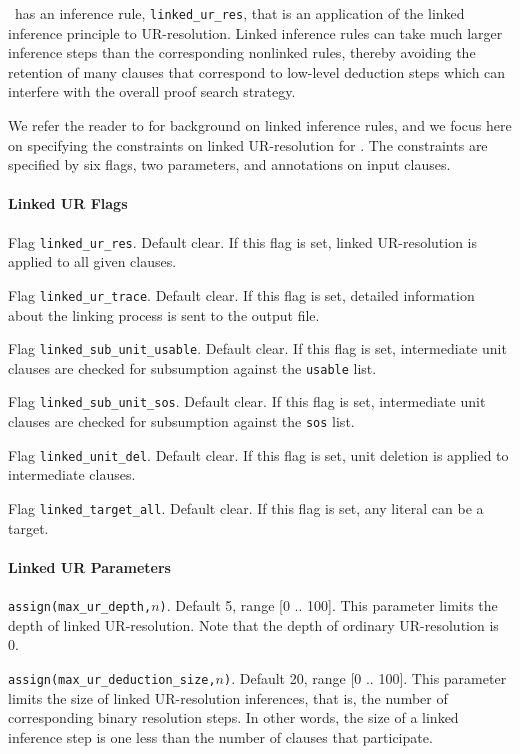 \documentclass[11pt]{article}
\begin{document}
\otter\ has an inference rule, \verb:linked_ur_res:, that is
an application of the linked inference principle to
UR-resolution.  Linked inference rules can take much
larger inference steps than the corresponding nonlinked rules,
thereby avoiding the retention of many clauses that correspond
to low-level deduction steps which can interfere with
the overall proof search strategy.

We refer the reader to \cite{link-I,link-II,link-implement}
for background on linked inference rules, and we focus
here on specifying the constraints on linked UR-resolution
for \otter.
The constraints are specified by six flags, two parameters,
and annotations on input clauses.

\paragraph{Linked UR Flags} \strut

\noindent
Flag \verb:linked_ur_res:.  Default clear.  If this flag is set,
linked UR-resolution is applied to all given clauses.

\noindent
Flag \verb:linked_ur_trace:.  Default clear.  If this flag is set,
detailed information about the linking process is sent to the
output file.

\noindent
Flag \verb:linked_sub_unit_usable:.  Default clear.  If this flag is set,
intermediate unit clauses are checked for subsumption against
the \verb:usable: list.

\noindent
Flag \verb:linked_sub_unit_sos:.  Default clear.  If this flag is set,
intermediate unit clauses are checked for subsumption against
the \verb:sos: list.

\noindent
Flag \verb:linked_unit_del:.  Default clear.  If this flag is set,
unit deletion is applied to intermediate clauses.

\noindent
Flag \verb:linked_target_all:.  Default clear.  If this flag is set,
any literal can be a target.

\paragraph{Linked UR Parameters} \strut

\noindent
\verb:assign(max_ur_depth,:$n$\verb:):.  Default 5, range [0 .. 100].
This parameter limits the depth of linked UR-resolution.
Note that the depth of ordinary UR-resolution is 0.

\noindent
\verb:assign(max_ur_deduction_size,:$n$\verb:):.  Default 20, range [0 .. 100].
This parameter limits the size of linked UR-resolution inferences,
that is, the number of corresponding binary resolution steps.
In other words, the size of a linked inference step is one less than
the number of clauses that participate.
\end{document}
